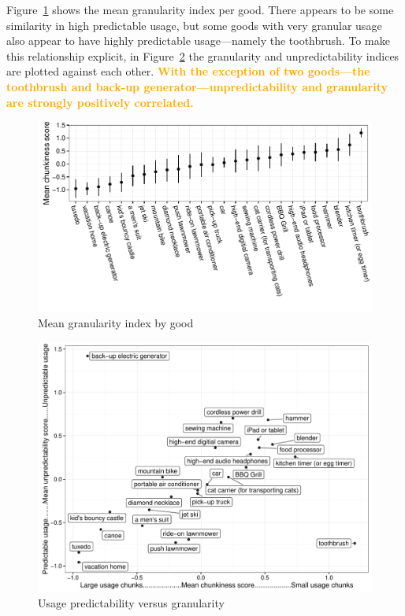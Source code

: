 \documentclass[11pt]{article}
\newcommand{\important}[1]{\textcolor{orange}{\textbf{#1}}}
\newcommand{\important}[1]{#1}
\begin{document}
Figure~\ref{fig:granularity} shows the mean granularity index per good. 
There appears to be some similarity in high predictable usage, but some goods with very granular usage also appear to have highly predictable usage---namely the toothbrush. 
To make this relationship explicit, in Figure~\ref{fig:granularity_v_predictability} the granularity and unpredictability indices are plotted against each other. 
\important{With the exception of two goods---the toothbrush and back-up generator---unpredictability and granularity are strongly positively correlated.}

\begin{figure}
\centering 
\caption{Mean granularity index by good \label{fig:granularity}}
\begin{minipage}{0.90 \linewidth}
\includegraphics[width = \linewidth]{./plots/granularity.pdf} 
\end{minipage} 
\end{figure} 

\begin{figure}
\centering 
\caption{Usage predictability versus granularity \label{fig:granularity_v_predictability}}
\begin{minipage}{0.90 \linewidth}
\includegraphics[width = \linewidth]{./plots/granularity_versus_predictability.pdf} 
\end{minipage} 
\end{figure} 
\end{document}
